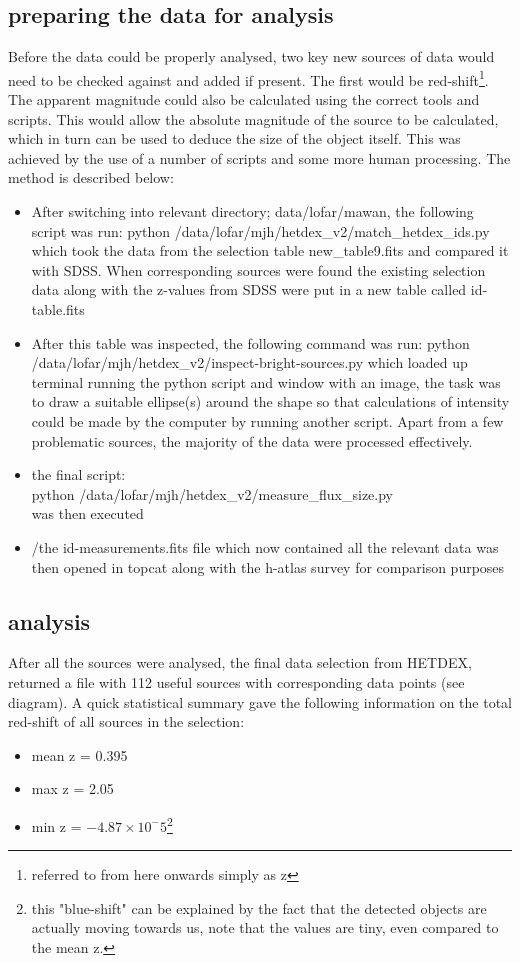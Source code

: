 \documentclass{article}
\begin{document}
\subsection{preparing the data for analysis}
Before the data could be properly analysed, two key new sources of data would need to be checked against and added if present. The first would be red-shift\footnote{referred to from here onwards simply as z}. The apparent magnitude could also be calculated using the correct tools and scripts. This would allow the absolute magnitude of the source to be calculated, which in turn can be used to deduce the size of the object itself. This was achieved by the use of a number of scripts and some more human processing. The method is described below:

\begin{itemize}
    \item After switching into relevant directory; data/lofar/mawan, the following script was run: python /data/lofar/mjh/hetdex{\_}v2/match{\_}hetdex{\_}ids.py which took the data from the selection table new{\_}table9.fits and compared it with SDSS. When corresponding sources were found the existing selection data along with the z-values from SDSS were put in a new table called id-table.fits
    \item After this table was inspected, the following command was run: python /data/lofar/mjh/hetdex{\_}v2/inspect-bright-sources.py which loaded up terminal running the python script and window with an image, the task was to draw a suitable ellipse(s) around the shape so that calculations of intensity could be made by the computer by running another script. Apart from a few problematic sources, the majority of the data were processed effectively.
    \item the final script:\\
    python /data/lofar/mjh/hetdex{\_}v2/measure{\_}flux{\_}size.py\\
    was then executed
    \item /the  id-measurements.fits file which now contained all the relevant data was then opened in topcat along with the h-atlas survey for comparison purposes
\end{itemize}



\subsection{analysis}

After all the sources were analysed, the final data selection from HETDEX, returned a file with 112 useful sources with corresponding data points (see diagram). A quick statistical summary gave the following information on the total red-shift of all sources in the selection:
\begin{itemize}
    \item mean z = 0.395
    \item max z = 2.05
    \item min z = $-4.87 \times 10 ^ -5$\footnote{this "blue-shift" can be explained by the fact that the detected objects are actually moving towards us, note that the values are tiny, even compared to the mean z.}
\end{itemize}
\end{document}
